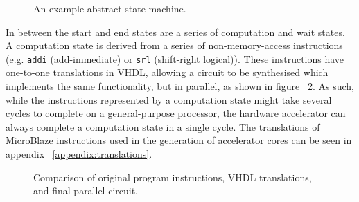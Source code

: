 \documentclass{UoYCSproject}
\begin{document}
\begin{figure}[H]
\centering
{}
\caption{An example abstract state machine.}
\label{fig:abstractStateMachine}
\end{figure}

In between the start and end states are a series of computation and wait states. A computation state is derived from a series of
non-memory-access instructions (e.g. \texttt{addi} (add-immediate) or \texttt{srl} (shift-right logical)).
These instructions have one-to-one translations in VHDL, allowing a circuit to be synthesised which implements the same
functionality, but in parallel, as shown in figure ~\ref{fig:computationState}. As such, while the instructions represented by a
computation state might take several cycles to complete on a general-purpose processor, the hardware accelerator can always
complete a computation state in a single cycle. The translations of MicroBlaze instructions used in the generation of
accelerator cores can be seen in appendix ~\ref{appendix:translations}.

\begin{figure}[H]
\caption{Comparison of original program instructions, VHDL translations, and final parallel circuit.}
\label{fig:computationState}
\end{figure}
\end{document}
